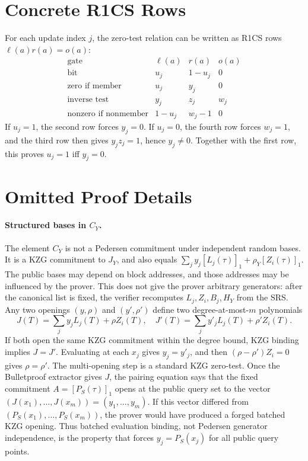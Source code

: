\documentclass[runningheads]{llncs}
\begin{document}
\section{Concrete R1CS Rows}\label{app:r1cs}

For each update index \(j\), the zero-test relation can be written as R1CS rows \(\ell(a)r(a)=o(a)\):
\[
\begin{array}{c|c|c|c}
\text{gate} & \ell(a) & r(a) & o(a) \\
\hline
\text{bit} & u_j & 1-u_j & 0 \\
\text{zero if member} & u_j & y_j & 0 \\
\text{inverse test} & y_j & z_j & w_j \\
\text{nonzero if nonmember} & 1-u_j & w_j-1 & 0
\end{array}
\]
If \(u_j=1\), the second row forces \(y_j=0\).  If \(u_j=0\), the fourth row forces \(w_j=1\), and the third row then gives \(y_jz_j=1\), hence \(y_j\ne 0\).  Together with the first row, this proves \(u_j=1\) iff \(y_j=0\).

\section{Omitted Proof Details}\label{app:proofs}

\paragraph{Structured bases in \(C_Y\).}
The element \(C_Y\) is not a Pedersen commitment under independent random bases.  It is a KZG commitment to \(J_Y\), and also equals \(\sum_jy_j[L_j(\tau)]_1+\rho_Y[Z_i(\tau)]_1\).  The public bases may depend on block addresses, and those addresses may be influenced by the prover.  This does not give the prover arbitrary generators: after the canonical list is fixed, the verifier recomputes \(L_j,Z_i,B_j,H_Y\) from the SRS.  Any two openings \((y,\rho)\) and \((y',\rho')\) define two degree-at-most-\(m\) polynomials
\[
        J(T)=\sum_jy_jL_j(T)+\rho Z_i(T),
        \quad
        J'(T)=\sum_jy'_jL_j(T)+\rho'Z_i(T).
\]
If both open the same KZG commitment within the degree bound, KZG binding implies \(J=J'\).  Evaluating at each \(x_j\) gives \(y_j=y'_j\), and then \((\rho-\rho')Z_i=0\) gives \(\rho=\rho'\).  The multi-opening step is a standard KZG zero-test.  Once the Bulletproof extractor gives \(J\), the pairing equation says that the fixed commitment \(A=[P_S(\tau)]_1\) opens at the public query set to the vector \((J(x_1),\ldots,J(x_m))=(y_1,\ldots,y_m)\).  If this vector differed from \((P_S(x_1),\ldots,P_S(x_m))\), the prover would have produced a forged batched KZG opening.  Thus batched evaluation binding, not Pedersen generator independence, is the property that forces \(y_j=P_S(x_j)\) for all public query points.
\end{document}
